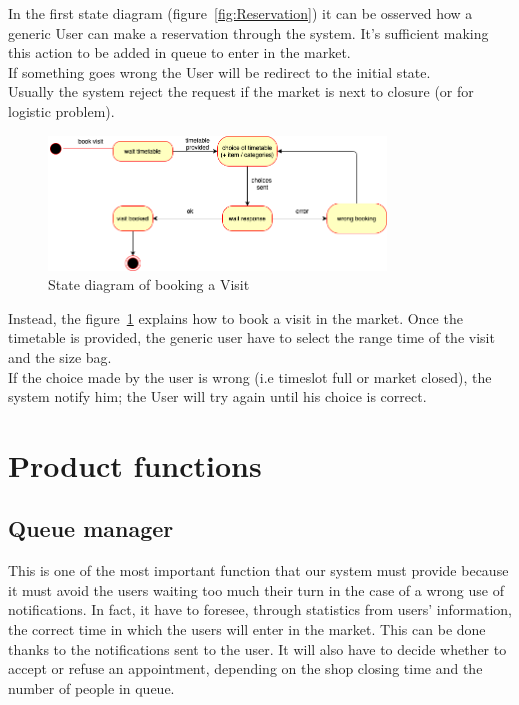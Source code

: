 In the first state diagram (figure~\ref{fig:Reservation}) it can be osserved how a generic User can make a reservation through the system. It's sufficient making this action to be added in queue to enter in the market.
\\If something goes wrong the User will be redirect to the initial state.
\\Usually the system reject the request if the market is next to closure (or for logistic problem).

\par 
\medskip

\begin{figure}[h]
  \caption{State diagram of booking a Visit}
  \label{fig:Visit}
  \centering
  \includegraphics[width=0.8\textwidth, height=0.4\textwidth]{diagrams/2-visit.png}
\end{figure}

\par 
\medskip

Instead, the figure~\ref{fig:Visit} explains how to book a visit in the market. Once the timetable is provided, the generic user have to select the range time of the visit and the size bag.
\\
If the choice made by the user is wrong (i.e timeslot full or market closed), the system notify him; the User will try again until his choice is correct.
\par 
\medskip


\section{Product functions}
\subsection{Queue manager}
This is one of the most important function that our system must provide because it must avoid the users waiting too much their turn in the case of a wrong use of notifications. 
In fact, it have to foresee, through statistics from users’ information, the correct time in which the users will enter in the market. This can be done thanks to the notifications sent to the user.
It will also have to decide whether to accept or refuse an appointment, depending on the shop closing time and the number of people in queue. 



